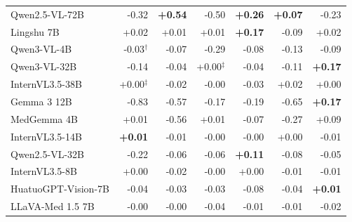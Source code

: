 \documentclass{article}
\begin{document}
\begin{table}[htbp]
{\begin{tabular}{lrrrrrr}
Qwen2.5-VL-72B & \cellcolor{cfSlate4}-0.32 & \cellcolor{cfTerra4}\textbf{+0.54} & \cellcolor{cfSlate4}-0.50 & \cellcolor{cfTerra4}\textbf{+0.26} & \cellcolor{cfTerra2}\textbf{+0.07} & \cellcolor{cfSlate3}-0.23 \\
Lingshu 7B & \cellcolor{cfTerra1}+0.02 & \cellcolor{cfTerra1}+0.01 & \cellcolor{cfTerra1}+0.01 & \cellcolor{cfTerra3}\textbf{+0.17} & \cellcolor{cfSlate2}-0.09 & \cellcolor{cfTerra1}+0.02 \\
Qwen3-VL-4B & \cellcolor{cfSlate2}-0.03$^{\dagger}$ & \cellcolor{cfSlate2}-0.07 & \cellcolor{cfSlate4}-0.29 & \cellcolor{cfSlate2}-0.08 & \cellcolor{cfSlate3}-0.13 & \cellcolor{cfSlate2}-0.09 \\
Qwen3-VL-32B & \cellcolor{cfSlate3}-0.14 & \cellcolor{cfSlate2}-0.04 & \cellcolor{cfTerra1}+0.00$^{\ddagger}$ & \cellcolor{cfSlate2}-0.04 & \cellcolor{cfSlate3}-0.11 & \cellcolor{cfTerra3}\textbf{+0.17} \\
InternVL3.5-38B & \cellcolor{cfTerra1}+0.00$^{\ddagger}$ & \cellcolor{cfSlate1}-0.02 & \cellcolor{cfSlate1}-0.00 & \cellcolor{cfSlate2}-0.03 & \cellcolor{cfTerra1}+0.02 & \cellcolor{cfTerra1}+0.00 \\
Gemma 3 12B & \cellcolor{cfSlate4}-0.83 & \cellcolor{cfSlate4}-0.57 & \cellcolor{cfSlate3}-0.17 & \cellcolor{cfSlate3}-0.19 & \cellcolor{cfSlate4}-0.65 & \cellcolor{cfTerra3}\textbf{+0.17} \\
MedGemma 4B & \cellcolor{cfTerra1}+0.01 & \cellcolor{cfSlate4}-0.56 & \cellcolor{cfTerra1}+0.01 & \cellcolor{cfSlate2}-0.07 & \cellcolor{cfSlate4}-0.27 & \cellcolor{cfTerra2}+0.09 \\
InternVL3.5-14B & \cellcolor{cfTerra1}\textbf{+0.01} & \cellcolor{cfSlate1}-0.01 & \cellcolor{cfSlate1}-0.00 & \cellcolor{cfSlate1}-0.00 & \cellcolor{cfTerra1}+0.00 & \cellcolor{cfSlate1}-0.01 \\
Qwen2.5-VL-32B & \cellcolor{cfSlate3}-0.22 & \cellcolor{cfSlate2}-0.06 & \cellcolor{cfSlate2}-0.06 & \cellcolor{cfTerra3}\textbf{+0.11} & \cellcolor{cfSlate2}-0.08 & \cellcolor{cfSlate2}-0.05 \\
InternVL3.5-8B & \cellcolor{cfTerra1}+0.00 & \cellcolor{cfSlate1}-0.02 & \cellcolor{cfSlate1}-0.00 & \cellcolor{cfTerra1}+0.00 & \cellcolor{cfSlate1}-0.01 & \cellcolor{cfSlate1}-0.01 \\
HuatuoGPT-Vision-7B & \cellcolor{cfSlate2}-0.04 & \cellcolor{cfSlate2}-0.03 & \cellcolor{cfSlate2}-0.03 & \cellcolor{cfSlate2}-0.08 & \cellcolor{cfSlate2}-0.04 & \cellcolor{cfTerra1}\textbf{+0.01} \\
LLaVA-Med 1.5 7B & \cellcolor{cfSlate1}-0.00 & \cellcolor{cfSlate1}-0.00 & \cellcolor{cfSlate2}-0.04 & \cellcolor{cfSlate1}-0.01 & \cellcolor{cfSlate1}-0.01 & \cellcolor{cfSlate2}-0.02 \\

\end{tabular}}
\end{table}
\end{document}
